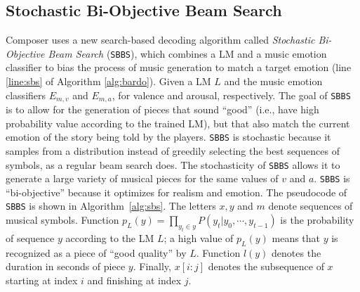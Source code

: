 \subsection{Stochastic Bi-Objective Beam Search}

Composer uses a new search-based decoding algorithm called \textit{Stochastic Bi-Objective Beam Search} (\texttt{SBBS}), which combines a LM and a music emotion classifier to bias the process of music generation to match a target emotion (line \ref{line:sbs} of Algorithm \ref{alg:bardo}). Given a LM $L$ and the music emotion classifiers $E_{m, v}$ and $E_{m, a}$, for valence and arousal, respectively. The goal of \texttt{SBBS} is to allow for the generation of pieces that sound ``good'' (i.e., have high probability value according to the trained LM), but that also match the current emotion of the story being told by the players. \texttt{SBBS} is stochastic because it samples from a distribution instead of greedily selecting the best sequences of symbols, as a regular beam search does. The stochasticity of \texttt{SBBS} allows it to generate a large variety of musical pieces for the same values of $v$ and $a$. \texttt{SBBS} is ``bi-objective'' because it optimizes for realism and emotion.
The pseudocode of \texttt{SBBS} is shown in Algorithm~\ref{alg:sbs}. The letters $x, y$ and $m$ denote sequences of musical symbols. Function $p_L(y) = \prod_{y_t \in y} P(y_t|y_0, \cdots, y_{t-1})$ is the probability of sequence $y$ according to the LM $L$; a high value of $p_L(y)$ means that $y$ is recognized as a piece of ``good quality'' by $L$. Function $l(y)$ denotes the duration in seconds of piece $y$. Finally, $x[i:j]$ denotes the subsequence of $x$ starting at index $i$ and finishing at index $j$.


